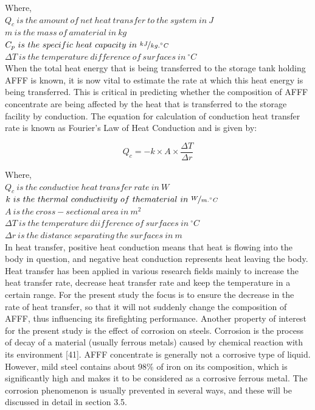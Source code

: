 \documentclass[12pt]{report}
\begin{document}
\noindent Where, \\
$Q_c\ is\ the\ amount\ of\ net\ heat\ transfer\ to\ the\ system\ in\ J$ \\
$m\ is\ the\ mass\ of\ amaterial\ in\ kg$ \\
$C_p\ is\ the\ specific\ heat\ capacity\ in\ \nicefrac{kJ}{kg.^\circ C}$ \\
$\Delta T\ is\ the\ temperature\ difference\ of\ surfaces\ in\ ^\circ C$ \\

When the total heat energy that is being transferred to the storage tank holding AFFF is known, it is now vital to estimate the rate at which this heat energy is being transferred. This is critical in predicting whether the composition of AFFF concentrate are being affected by the heat that is transferred to the storage facility by conduction. The equation for calculation of conduction heat transfer rate is known as Fourier’s Law of Heat Conduction and is given by:

\begin{equation}
    Q_c = -k \times A \times \frac{\Delta T}{\Delta r}
\end{equation}

\noindent Where, \\
$Q_c\ is\ the\ conductive\ heat\ transfer\ rate\ in\ W$ \\
$k\ is\ the\ thermal\ conductivity\ of\ thematerial\ in\ \nicefrac{W}{m.^\circ C}$ \\
$A\ is\ the\ cross-sectional\ area\ in\ m^2$ \\
$\Delta T\ is\ the\ temperature\ diifference\ of\ surfaces\ in\ ^\circ C$ \\
$\Delta r\ is\ the\ distance\ separating\ the\ surfaces\ in\ m$ \\

In heat transfer, positive heat conduction means that heat is flowing into the body in question, and negative heat conduction represents heat leaving the body. Heat transfer has been applied in various research fields mainly to increase the heat transfer rate, decrease heat transfer rate and keep the temperature in a certain range. For the present study the focus is to ensure the decrease in the rate of heat transfer, so that it will not suddenly change the composition of AFFF, thus influencing its firefighting performance.  
Another property of interest for the present study is the effect of corrosion on steels. Corrosion is the process of decay of a material (usually ferrous metals) caused by chemical reaction with its environment [41]. AFFF concentrate is generally not a corrosive type of liquid. However, mild steel contains about 98\% of iron on its composition, which is significantly high and makes it to be considered as a corrosive ferrous metal.  The corrosion phenomenon is usually prevented in several ways, and these will be discussed in detail in section 3.5.
\end{document}
